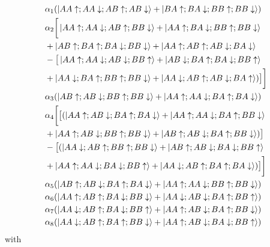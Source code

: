 \documentclass[prb,aps,amssymb,twocolumn,notitlepage]{revtex4-2}
\begin{document}
\begin{align}
    &\alpha_{1}(\ket{AA\uparrow;AA\downarrow;AB\uparrow;AB\downarrow}+\ket{BA\uparrow;BA\downarrow;BB\uparrow;BB\downarrow}) \\
&\alpha_{2}\bigg[\ket{AA\uparrow;AA\downarrow;AB\uparrow;BB\downarrow}+\ket{AA\uparrow;BA\downarrow;BB\uparrow;BB\downarrow} \nonumber \\
&+\ket{AB\uparrow;BA\uparrow;BA\downarrow;BB\downarrow}+\ket{AA\uparrow;AB\uparrow;AB\downarrow;BA\downarrow} \nonumber \\
&-\big[\ket{AA\uparrow;AA\downarrow;AB\downarrow;BB\uparrow}+\ket{AB\downarrow;BA\uparrow;BA\downarrow;BB\uparrow} \nonumber \\
&+\ket{AA\downarrow;BA\uparrow;BB\uparrow;BB\downarrow}+\ket{AA\downarrow;AB\uparrow;AB\downarrow;BA\uparrow})\big]\bigg] \nonumber \\
&\alpha_{3}(\ket{AB\uparrow;AB\downarrow;BB\uparrow;BB\downarrow}+\ket{AA\uparrow;AA\downarrow;BA\uparrow;BA\downarrow}) \nonumber \\
&\alpha_{4}\bigg[\big[(\ket{AA\uparrow;AB\downarrow;BA\uparrow;BA\downarrow}+\ket{AA\uparrow;AA\downarrow;BA\uparrow;BB\downarrow} \nonumber \\
&+\ket{AA\uparrow;AB\downarrow;BB\uparrow;BB\downarrow}+\ket{AB\uparrow;AB\downarrow;BA\uparrow;BB\downarrow})\big] \nonumber \\
&-\big[(\ket{AA\downarrow;AB\uparrow;BB\uparrow;BB\downarrow}+\ket{AB\uparrow;AB\downarrow;BA\downarrow;BB\uparrow} \nonumber \\&+\ket{AA\uparrow;AA\downarrow;BA\downarrow;BB\uparrow}+\ket{AA\downarrow;AB\uparrow;BA\uparrow;BA\downarrow})\big]\bigg] \nonumber \\
&\alpha_{5}(\ket{AB\uparrow;AB\downarrow;BA\uparrow;BA\downarrow}+\ket{AA\uparrow;AA\downarrow;BB\uparrow;BB\downarrow}) \nonumber \\
&\alpha_{6}(\ket{AA\uparrow;AB\uparrow;BA\downarrow;BB\downarrow}+\ket{AA\downarrow;AB\downarrow;BA\uparrow;BB\uparrow}) \nonumber \\
&\alpha_{7}(\ket{AA\downarrow;AB\uparrow;BA\downarrow;BB\uparrow}+\ket{AA\uparrow;AB\downarrow;BA\uparrow;BB\downarrow}) \nonumber \\
&\alpha_{8}(\ket{AA\downarrow;AB\uparrow;BA\uparrow;BB\downarrow}+\ket{AA\uparrow;AB\downarrow;BA\downarrow;BB\uparrow}) \nonumber 
\end{align}
with
\end{document}

